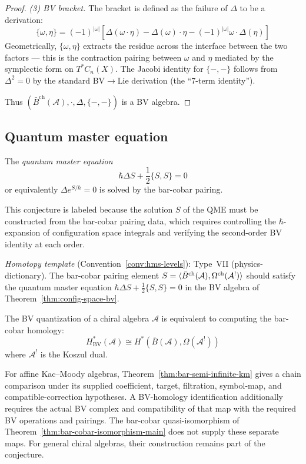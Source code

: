 \begin{proof}
\emph{(3) BV bracket.}
The bracket is defined as the failure of $\Delta$ to be a derivation:
\[
\{\omega, \eta\} = (-1)^{|\omega|}[\Delta(\omega \cdot \eta) - \Delta(\omega) \cdot \eta - (-1)^{|\omega|}\omega \cdot \Delta(\eta)]
\]
Geometrically, $\{\omega, \eta\}$ extracts the residue across the interface between the two factors — this is the contraction pairing between $\omega$ and $\eta$ mediated by the symplectic form on $T^*C_n(X)$.  The Jacobi identity for $\{-,-\}$ follows from $\Delta^2 = 0$ by the standard BV$\to$Lie derivation (the ``7-term identity'').

Thus $(\bar{B}^{\mathrm{ch}}(\mathcal{A}), \cdot, \Delta, \{-,-\})$ is a BV algebra.
\end{proof}

\subsection{Quantum master equation}

\begin{conjecture}
\label{conj:quantum-master-complete}
The \emph{quantum master equation}
\[\hbar \Delta S + \frac{1}{2}\{S, S\} = 0\]
or equivalently $\Delta e^{S/\hbar} = 0$
is solved by the bar-cobar pairing.
\end{conjecture}

\begin{remark}[Scope]
This conjecture is labeled \ClaimStatusHeuristic{} because the solution $S$ of
the QME must be constructed from the bar-cobar pairing data, which requires
controlling the $\hbar$-expansion of configuration space integrals and verifying
the second-order BV identity at each order.

\emph{Homotopy template} (Convention~\ref{conv:hms-levels}): Type~VII (physics-dictionary).
The bar-cobar pairing element $S = \langle \bar{B}^{\mathrm{ch}}(\mathcal{A}), \Omega^{\mathrm{ch}}(\mathcal{A}^!) \rangle$ should satisfy the quantum master equation $\hbar \Delta S + \tfrac{1}{2}\{S, S\} = 0$ in the BV algebra of Theorem~\ref{thm:config-space-bv}.
\end{remark}

\begin{conjecture}[BV quantization = bar-cobar duality; \ClaimStatusHeuristic]
\label{conj:bv-equals-bar-cobar}
The BV quantization of a chiral algebra $\mathcal{A}$ is equivalent to computing the
bar-cobar homology:
\[H^*_{\text{BV}}(\mathcal{A}) \cong H^*(\bar{B}(\mathcal{A}), \Omega(\mathcal{A}^!))\]
where $\mathcal{A}^!$ is the Koszul dual.

For affine Kac--Moody algebras, Theorem~\ref{thm:bar-semi-infinite-km} gives a chain comparison under its supplied coefficient, target, filtration, symbol-map, and compatible-correction hypotheses.
A BV-homology identification additionally requires the actual BV complex and compatibility of that map with the required BV operations and pairings.
The bar-cobar quasi-isomorphism of Theorem~\ref{thm:bar-cobar-isomorphism-main} does not supply these separate maps.
For general chiral algebras, their construction remains part of the conjecture.
\end{conjecture}

